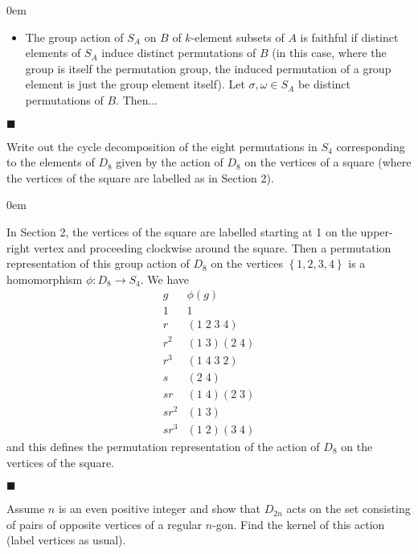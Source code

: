 \documentclass[12pt]{article}
\renewcommand{\qed}{\hfill$\blacksquare$}
\renewenvironment{proof}{\begin{addmargin}[1em]{0em}\begin{newproof}}{\end{newproof}\end{addmargin}\qed}
\newenvironment{problem}[2][Exercise]{\begin{trivlist}
\item[\hskip \labelsep {\bfseries #1}\hskip \labelsep {\bfseries #2.}]}{\end{trivlist}}
\begin{document}
\begin{proof}
    \begin{itemize}
        \item The group action of $S_A$ on $B$ of $k$-element subsets of $A$ is faithful if distinct elements of $S_A$ induce distinct permutations of $B$ (in this case, where the group is itself the permutation group, the induced permutation of a group element is just the group element itself). Let $\sigma, \omega \in S_A$ be distinct permutations of $B$. Then...
    \end{itemize}
\end{proof}




\begin{problem}{1.7.11}
Write out the cycle decomposition of the eight permutations in $S_4$ corresponding to the elements of $D_8$ given by the action of $D_8$ on the vertices of a square (where the vertices of the square are labelled as in Section 2).
\end{problem}
\begin{proof}
In Section 2, the vertices of the square are labelled starting at 1 on the upper-right vertex and proceeding clockwise around the square. Then a permutation representation of this group action of $D_8$ on the vertices $\left\{1,2,3,4\right\}$ is a homomorphism $\phi:D_8\rightarrow S_4$. We have
\begin{equation*}
    \begin{array}{c|c}
    g & \phi\left(g\right) \\ \hline
    1 & 1 \\
    r & \left(1\;2\;3\;4\right) \\
    r^2 & \left(1\;3\right)\left(2\;4\right) \\
    r^3 & \left(1\;4\;3\;2\right) \\
    s & \left(2\;4\right) \\
    sr & \left(1\;4\right)\left(2\;3\right) \\
    sr^2 & \left(1\;3\right) \\
    sr^3 & \left(1\;2\right)\left(3\;4\right)
    \end{array}
\end{equation*}
and this defines the permutation representation of the action of $D_8$ on the vertices of the square.
\end{proof}



\begin{problem}{1.7.12}
Assume $n$ is an even positive integer and show that $D_{2n}$ acts on the set consisting of pairs of opposite vertices of a regular $n$-gon. Find the kernel of this action (label vertices as usual).
\end{problem}
\end{document}
